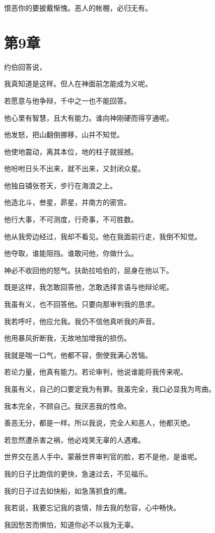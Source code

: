 \documentclass[12pt,oneside]{book}
\begin{document}
恨恶你的要披戴惭愧。恶人的帐棚，必归无有。



\chapter{第9章}
约伯回答说，

我真知道是这样。但人在神面前怎能成为义呢。

若愿意与他争辩，千中之一也不能回答。

他心里有智慧，且大有能力。谁向神刚硬而得亨通呢。

他发怒，把山翻倒挪移，山并不知觉。

他使地震动，离其本位，地的柱子就摇撼。

他吩咐日头不出来，就不出来，又封闭众星。

他独自铺张苍天，步行在海浪之上。

他造北斗，叁星，昴星，并南方的密宫。

他行大事，不可测度，行奇事，不可胜数。

他从我旁边经过，我却不看见。他在我面前行走，我倒不知觉。

他夺取，谁能阻挡。谁敢问他，你做什么。

神必不收回他的怒气。扶助拉哈伯的，屈身在他以下。

既是这样，我怎敢回答他，怎敢选择言语与他辩论呢。

我虽有义，也不回答他。只要向那审判我的恳求。

我若呼吁，他应允我。我仍不信他真听我的声音。

他用暴风折断我，无故地加增我的损伤。

我就是喘一口气，他都不容，倒使我满心苦恼。

若论力量，他真有能力。若论审判，他说谁能将我传来呢。

我虽有义，自己的口要定我为有罪。我虽完全，我口必显我为弯曲。

我本完全，不顾自己。我厌恶我的性命。

善恶无分，都是一样。所以我说，完全人和恶人，他都灭绝。

若忽然遭杀害之祸，他必戏笑无辜的人遇难。

世界交在恶人手中。蒙蔽世界审判官的脸，若不是他，是谁呢。

我的日子比跑信的更快，急速过去，不见福乐。

我的日子过去如快船，如急落抓食的鹰。

我若说，我要忘记我的哀情，除去我的愁容，心中畅快。

我因愁苦而惧怕，知道你必不以我为无辜。
\end{document}
